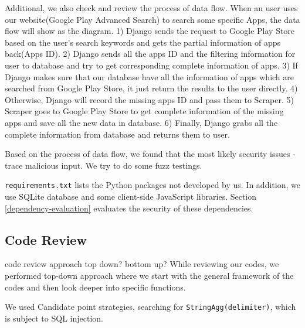 \documentclass[12pt, a4paper]{article}
\newcommand{\code}[1]{\texttt{#1}}
\begin{document}
Additional, we also check and review the process of data flow. When an user uses our website(Google Play Advanced Search) to search some specific Apps, the data flow will show as the diagram. 1) Django sends the request to Google Play Store based on the user's search keywords and gets the partial information of apps back(Apps ID). 2) Django sends all the apps ID and the filtering information for user to database and try to get corresponding complete information of apps. 3) If Django makes sure that our database have all the information of apps which are searched from Google Play Store, it just return the results to the user directly. 4) Otherwise, Django will record the missing apps ID and pass them to Scraper. 5) Scraper goes to Google Play Store to get complete information of the missing apps and save all the new data in database. 6) Finally, Django grabs all the complete information from database and returns them to user.

Based on the process of data flow, we found that the most likely security issues - trace malicious input. We try to do some fuzz testings. 

\code{requirements.txt} lists the Python packages not developed by us. In addition, we use SQLite database and some client-side JavaScript libraries. Section \ref{dependency-evaluation} evaluates the security of these dependencies.

\subsection{Code Review}
code review approach
top down? bottom up?
While reviewing our codes, we performed top-down approach where we start with the general framework of the codes and then look deeper into specific functions.

We used Candidate point strategies, searching for \code{StringAgg(delimiter)}, which is subject to SQL injection.



\end{document}
